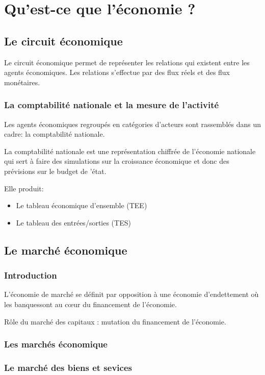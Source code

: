 \chapter{Qu'est-ce que l'économie ? }

	\section{Le circuit économique}
	Le circuit économique permet de représenter les relations qui existent entre les agents économiques. Les relations s'effectue par des flux réels et
	des flux monétaires.

	\subsection{La comptabilité nationale et la mesure de l'activité}
	Les agents économiques regroupés en catégories d'acteurs sont rassemblés dans un cadre: la comptabilité nationale.

	La comptabilité nationale est une représentation chiffrée de l'économie nationale qui sert à faire des simulations sur la croissance économique et
	donc des prévisions sur le budget de 'état.

	Elle produit: 
	\begin{itemize}
		\item Le tableau économique d'ensemble (TEE)
		\item Le tableau des entrées/sorties (TES)
	\end{itemize}
	\section{Le marché économique}
	\subsection{Introduction}
	\begin{definition}
		L'économie de marché se définit par opposition à une économie d'endettement où les banquessont au cœur du financement de l'économie.
	\end{definition}
	\begin{definition}
		Rôle du marché des capitaux : mutation du financement de l'économie.
	\end{definition}
	\subsection{Les marchés économique}
	\subsection{Le marché des biens et sevices}

